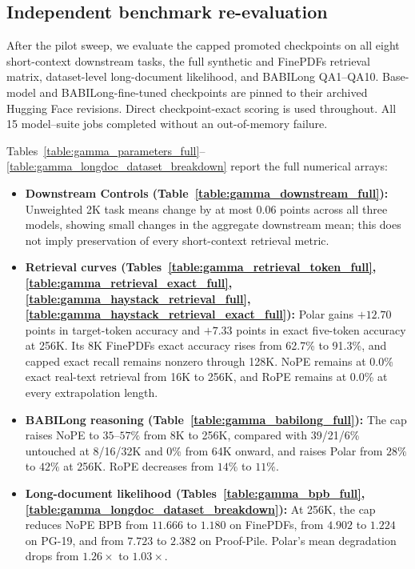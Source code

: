 \subsection{Independent benchmark re-evaluation}
After the pilot sweep, we evaluate the capped promoted checkpoints on all eight short-context downstream tasks, the full synthetic and FinePDFs retrieval matrix, dataset-level long-document likelihood, and BABILong QA1--QA10. Base-model and BABILong-fine-tuned checkpoints are pinned to their archived Hugging Face revisions. Direct checkpoint-exact scoring is used throughout. All 15 model--suite jobs completed without an out-of-memory failure.

Tables~\ref{table:gamma_parameters_full}--\ref{table:gamma_longdoc_dataset_breakdown} report the full numerical arrays:
\begin{itemize}
  \item \textbf{Downstream Controls (Table~\ref{table:gamma_downstream_full}):} Unweighted 2K task means change by at most $0.06$ points across all three models, showing small changes in the aggregate downstream mean; this does not imply preservation of every short-context retrieval metric.
  \item \textbf{Retrieval curves (Tables~\ref{table:gamma_retrieval_token_full}, \ref{table:gamma_retrieval_exact_full}, \ref{table:gamma_haystack_retrieval_full}, \ref{table:gamma_haystack_retrieval_exact_full}):} Polar gains $+12.70$ points in target-token accuracy and $+7.33$ points in exact five-token accuracy at 256K. Its 8K FinePDFs exact accuracy rises from 62.7\% to 91.3\%, and capped exact recall remains nonzero through 128K. NoPE remains at 0.0\% exact real-text retrieval from 16K to 256K, and RoPE remains at 0.0\% at every extrapolation length.
  \item \textbf{BABILong reasoning (Table~\ref{table:gamma_babilong_full}):} The cap raises NoPE to $35$--$57\%$ from 8K to 256K, compared with 39/21/6\% untouched at 8/16/32K and 0\% from 64K onward, and raises Polar from $28\%$ to $42\%$ at 256K. RoPE decreases from $14\%$ to $11\%$.
  \item \textbf{Long-document likelihood (Tables~\ref{table:gamma_bpb_full}, \ref{table:gamma_longdoc_dataset_breakdown}):} At 256K, the cap reduces NoPE BPB from $11.666$ to $1.180$ on FinePDFs, from $4.902$ to $1.224$ on PG-19, and from $7.723$ to $2.382$ on Proof-Pile. Polar's mean degradation drops from $1.26\times$ to $1.03\times$.
\end{itemize}

